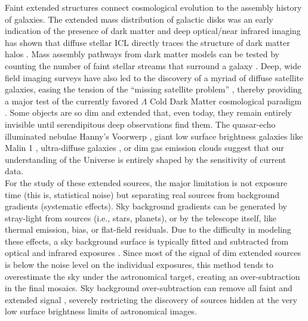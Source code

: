 \documentclass{iau}
\begin{document}
Faint extended structures connect cosmological evolution to the assembly history of galaxies. The extended mass distribution of galactic disks was an early indication of the presence of dark matter \citep{freeman1970apj160_811} and deep optical/near infrared imaging has shown that diffuse stellar ICL directly traces the structure of dark matter halos \citep{montes+2019mnras482_2838}. Mass assembly pathways from dark matter models can be tested by counting the number of faint stellar streams that surround a galaxy \citep[a proxy of the number of past merging events, ][]{johnston+2008apj689_936}. Deep, wide field imaging surveys have also led to the discovery of a myriad of diffuse satellite galaxies, easing the tension of the ``missing satellite problem'' \citep{springel+2005nat435_629,martin+2019mnras485_796}, thereby providing a major test of the currently favored $\Lambda$ Cold Dark Matter cosmological paradigm \citep[e.g.,][]{moore+1999apj524_19,klypin+1999apj522_82, kim+2018prl121_211302}. Some objects are so dim and extended that, even today, they remain entirely invisible until serendipitous deep observations find them. The quasar-echo illuminated nebulae Hanny's Voorwerp \citep{jozsa+2009aap500_33}, giant low surface brightness galaxies like Malin 1 \citep{bothun+1987aj94_23}, ultra-diffuse galaxies \citep{vandokkum+2018nat555_629, montes+2020apj904_114}, or dim gas emission clouds \citep{drechsler+2023aas7_1, lumbrerascalle+2025aap704_224} suggest that our understanding of the Universe is entirely shaped by the sensitivity of current data.\\

For the study of these extended sources, the major limitation is not exposure time (this is, statistical noise) but separating real sources from background gradients (systematic effects). Sky background gradients can be generated by stray-light from sources (i.e., stars, planets), or by the telescope itself, like thermal emission, bias, or flat-field residuals. Due to the difficulty in modeling these effects, a sky background surface is typically fitted and subtracted from optical and infrared exposures \citep[][]{bertin+1996aap117_393}. Since most of the signal of dim extended sources is below the noise level on the individual exposures, this method tends to overestimate the sky under the astronomical target, creating an over-subtraction in the final mosaics. Sky background over-subtraction can remove all faint and extended signal \citep[i.e., stellar halos around galaxies;][]{akhlaghi+2015apj220_1}, severely restricting the discovery of sources hidden at the very low surface brightness limits of astronomical images.\\
\end{document}
